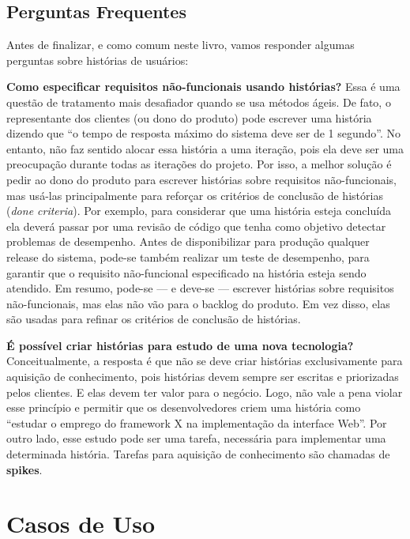 \documentclass[
  11pt,
  twoside]{book}
\begin{document}
\hypertarget{perguntas-frequentes-3}{%
\subsection{Perguntas Frequentes}\label{perguntas-frequentes-3}}

Antes de finalizar, e como comum neste livro, vamos responder algumas
perguntas sobre histórias de usuários:

\textbf{Como especificar requisitos não-funcionais usando histórias?}
Essa é uma questão de tratamento mais desafiador quando se usa métodos
ágeis. De fato, o representante dos clientes (ou dono do produto) pode
escrever uma história dizendo que ``o tempo de resposta máximo do
sistema deve ser de 1 segundo''. No entanto, não faz sentido alocar essa
história a uma iteração, pois ela deve ser uma preocupação durante todas
as iterações do projeto. Por isso, a melhor solução é pedir ao dono do
produto para escrever histórias sobre requisitos não-funcionais, mas
usá-las principalmente para reforçar os critérios de conclusão de
histórias (\emph{done criteria}). Por exemplo, para considerar que uma
história esteja concluída ela deverá passar por uma revisão de código
que tenha como objetivo detectar problemas de desempenho. Antes de
disponibilizar para produção qualquer release do sistema, pode-se também
realizar um teste de desempenho, para garantir que o requisito
não-funcional especificado na história esteja sendo atendido. Em resumo,
pode-se --- e deve-se --- escrever histórias sobre requisitos
não-funcionais, mas elas não vão para o backlog do produto. Em vez
disso, elas são usadas para refinar os critérios de conclusão de
histórias.

\textbf{É possível criar histórias para estudo de uma nova tecnologia?}
Conceitualmente, a resposta é que não se deve criar histórias
exclusivamente para aquisição de conhecimento, pois histórias devem
sempre ser escritas e priorizadas pelos clientes. E elas devem ter valor
para o negócio. Logo, não vale a pena violar esse princípio e permitir
que os desenvolvedores criem uma história como ``estudar o emprego do
framework X na implementação da interface Web''. Por outro lado, esse
estudo pode ser uma tarefa, necessária para implementar uma determinada
história. Tarefas para aquisição de conhecimento são chamadas de
\textbf{spikes}.

\hypertarget{casos-de-uso}{%
\section{Casos de Uso}\label{casos-de-uso}}
\end{document}
